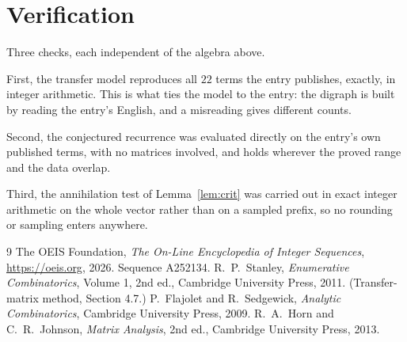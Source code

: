 \documentclass[11pt,a4paper]{article}
\theoremstyle{plain}
\theoremstyle{definition}
\begin{document}
\section{Verification}

Three checks, each independent of the algebra above.

First, the transfer model reproduces all $22$ terms the entry publishes, exactly, in
integer arithmetic. This is what ties the model to the entry: the digraph is built by reading
the entry's English, and a misreading gives different counts.

Second, the conjectured recurrence was evaluated directly on the entry's own published terms,
with no matrices involved, and holds wherever the proved range and the data overlap.

Third, the annihilation test of Lemma~\ref{lem:crit} was carried out in exact integer
arithmetic on the whole vector rather than on a sampled prefix, so no rounding or sampling
enters anywhere.

\begin{thebibliography}{9}
 The OEIS Foundation, \emph{The On-Line Encyclopedia of Integer
Sequences}, \url{https://oeis.org}, 2026. Sequence A252134.
 R.~P.~Stanley, \emph{Enumerative Combinatorics}, Volume 1, 2nd ed.,
Cambridge University Press, 2011. (Transfer-matrix method, Section 4.7.)
 P.~Flajolet and R.~Sedgewick, \emph{Analytic Combinatorics}, Cambridge
University Press, 2009.
 R.~A.~Horn and C.~R.~Johnson, \emph{Matrix Analysis}, 2nd ed., Cambridge
University Press, 2013.
\end{thebibliography}
\end{document}
